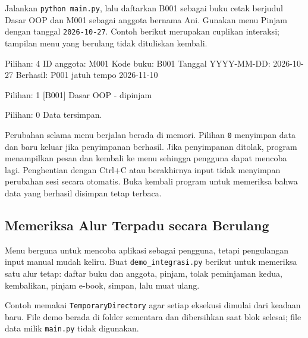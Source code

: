 Jalankan \texttt{python main.py}, lalu daftarkan B001 sebagai buku cetak berjudul Dasar OOP dan M001 sebagai anggota bernama Ani. Gunakan menu Pinjam dengan tanggal \texttt{2026-10-27}. Contoh berikut merupakan cuplikan interaksi; tampilan menu yang berulang tidak dituliskan kembali.

\begin{keluaran}
Pilihan: 4
ID anggota: M001
Kode buku: B001
Tanggal YYYY-MM-DD: 2026-10-27
Berhasil: P001 jatuh tempo 2026-11-10

Pilihan: 1
[B001] Dasar OOP - dipinjam

Pilihan: 0
Data tersimpan.
\end{keluaran}

Perubahan selama menu berjalan berada di memori. Pilihan \texttt{0} menyimpan data dan baru keluar jika penyimpanan berhasil. Jika penyimpanan ditolak, program menampilkan pesan dan kembali ke menu sehingga pengguna dapat mencoba lagi. Penghentian dengan Ctrl+C atau berakhirnya input tidak menyimpan perubahan sesi secara otomatis. Buka kembali program untuk memeriksa bahwa data yang berhasil disimpan tetap terbaca.

\subsection{Memeriksa Alur Terpadu secara Berulang}

Menu berguna untuk mencoba aplikasi sebagai pengguna, tetapi pengulangan input manual mudah keliru. Buat \texttt{demo\_integrasi.py} berikut untuk memeriksa satu alur tetap: daftar buku dan anggota, pinjam, tolak peminjaman kedua, kembalikan, pinjam e-book, simpan, lalu muat ulang.

Contoh memakai \texttt{TemporaryDirectory} agar setiap eksekusi dimulai dari keadaan baru. File demo berada di folder sementara dan dibersihkan saat blok selesai; file data milik \texttt{main.py} tidak digunakan.

